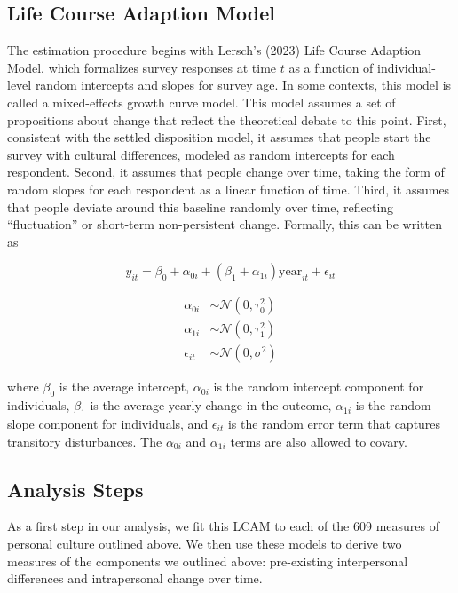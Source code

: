 \documentclass[
  12pt,
]{article}
\begin{document}
\hypertarget{life-course-adaption-model}{%
\subsection{Life Course Adaption
Model}\label{life-course-adaption-model}}

The estimation procedure begins with Lersch's (2023) Life Course
Adaption Model, which formalizes survey responses at time \(t\) as a
function of individual-level random intercepts and slopes for survey
age. In some contexts, this model is called a mixed-effects growth curve
model. This model assumes a set of propositions about change that
reflect the theoretical debate to this point. First, consistent with the
settled disposition model, it assumes that people start the survey with
cultural differences, modeled as random intercepts for each respondent.
Second, it assumes that people change over time, taking the form of
random slopes for each respondent as a linear function of time. Third,
it assumes that people deviate around this baseline randomly over time,
reflecting ``fluctuation'' or short-term non-persistent change.
Formally, this can be written as

\[
y_{it} = \beta_0 + \alpha_{0i} + (\beta_1 + \alpha_{1i}) \text{year}_{it} + \epsilon_{it}
\]

\[
\begin{aligned}
\alpha_{0i} &\sim \mathcal{N}(0,\tau^2_{0}) \\
\alpha_{1i} &\sim \mathcal{N}(0,\tau^2_{1}) \\
\epsilon_{it} &\sim \mathcal{N}(0,\sigma^2)
\end{aligned}
\]

where \(\beta_0\) is the average intercept, \(\alpha_{0i}\) is the
random intercept component for individuals, \(\beta_1\) is the average
yearly change in the outcome, \(\alpha_{1i}\) is the random slope
component for individuals, and \(\epsilon_{it}\) is the random error
term that captures transitory disturbances. The \(\alpha_{0i}\) and
\(\alpha_{1i}\) terms are also allowed to covary.

\hypertarget{analysis-steps}{%
\subsection{Analysis Steps}\label{analysis-steps}}

As a first step in our analysis, we fit this LCAM to each of the 609
measures of personal culture outlined above. We then use these models to
derive two measures of the components we outlined above: pre-existing
interpersonal differences and intrapersonal change over time.
\end{document}
